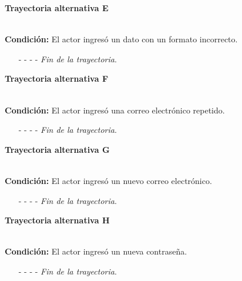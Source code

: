 \hypertarget{CU3-2:TAE}{\textbf{Trayectoria alternativa E}}\\
\noindent \textbf{Condición:} El actor ingresó un dato con un formato incorrecto.
\begin{enumerate}
	\UCpaso[\UCsist] Muestra el mensaje  señalando el campo que presenta el error en la pantalla .
	\UCpaso Regresa al paso \ref{CU3.2-P5} de la trayectoria principal.
	\item[- -] - - {\em {Fin de la trayectoria}}.
\end{enumerate}
\hypertarget{CU3-2:TAF}{\textbf{Trayectoria alternativa F}}\\
\noindent \textbf{Condición:} El actor ingresó una correo electrónico repetido.
\begin{enumerate}
	\UCpaso[\UCsist] Muestra el mensaje  señalando el campo que presenta la duplicidad en la pantalla.
	\UCpaso Regresa al paso \ref{CU3.2-P5} de la trayectoria principal.
	\item[- -] - - {\em {Fin de la trayectoria}}.
\end{enumerate}

\hypertarget{CU3-2:TAG}{\textbf{Trayectoria alternativa G}}\\
\noindent \textbf{Condición:} El actor ingresó un nuevo correo electrónico.
\begin{enumerate}
	\UCpaso[\UCsist] Envía un correo con el mensaje  a la nueva cuenta de correo electrónico proporcionada por el actor.
	\UCpaso Regresa al paso \ref{CU3.2-P10} de la trayectoria principal.
	\item[- -] - - {\em {Fin de la trayectoria}}.
\end{enumerate}
\hypertarget{CU3-2:TAH}{\textbf{Trayectoria alternativa H}}\\
\noindent \textbf{Condición:} El actor ingresó un nueva contraseña.
\begin{enumerate}
	\UCpaso[\UCsist] Envía un correo con el mensaje  con las nuevas credenciales a la cuenta de correo electrónico proporcionada por el actor.
	\UCpaso Regresa al paso \ref{CU3.2-P10} de la trayectoria principal.
	\item[- -] - - {\em {Fin de la trayectoria}}.
\end{enumerate}